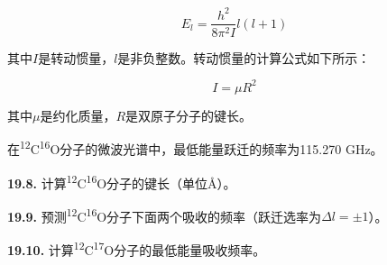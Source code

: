 $$E_l=\frac{h^2}{8\pi^2 I}l(l+1)$$

\noindent 其中\(I\)是转动惯量，\(l\)是非负整数。转动惯量的计算公式如下所示：

$$I = \mu R^2$$

\noindent 其中\(\mu\)是约化质量，\(R\)是双原子分子的键长。

在\textsuperscript{12}C\textsuperscript{16}O分子的微波光谱中，最低能量跃迁的频率为115.270
GHz。

\noindent\textbf{19.8.}
计算\textsuperscript{12}C\textsuperscript{16}O分子的键长（单位\AA）。

\noindent\textbf{19.9.}
预测\textsuperscript{12}C\textsuperscript{16}O分子下面两个吸收的频率（跃迁选率为$\Delta l
= \pm 1$）。

\noindent\textbf{19.10.}
计算\textsuperscript{12}C\textsuperscript{17}O分子的最低能量吸收频率。
